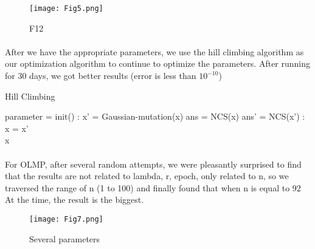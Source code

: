 \documentclass[10pt,letterpaper]{article}
\begin{document}
\begin{figure}[H]
  \centering
  \texttt{[image: Fig5.png]}\\
  \caption{F12}
  \label{straddltimeScale}
\end{figure}

\paragraph{}
After we have the appropriate parameters, we use the hill climbing algorithm as our optimization algorithm to continue to optimize the parameters. After running for 30 days, we got better results (error is less than $10^{-10}$)

\begin{algorithm}
  \caption{Hill Climbing}
  \begin{algorithmic}[1]
            parameter = init()
        \EndIf
        :
            x' = Gaussian-mutation(x)
            ans = NCS(x)
            ans' = NCS(x')
            :
                x = x'
            \EndIf
        \EndWhile\\
        \Return x
    \EndFunction  
  \end{algorithmic}  
\end{algorithm}

\paragraph{}
For OLMP, after several random attempts, we were pleasantly surprised to find that the results are not related to lambda, r, epoch, only related to n, so we traversed the range of n (1 to 100) and finally found that when n is equal to 92 At the time, the result is the biggest.

\begin{figure}[H]
  \centering
  \texttt{[image: Fig7.png]}\\
  \caption{Several parameters}
  \label{straddltimeScale}
\end{figure}



\end{document}
